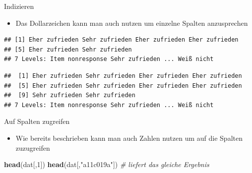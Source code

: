 \documentclass[ignorenonframetext,]{beamer}
\newenvironment{Shaded}{}{}
\newcommand{\KeywordTok}[1]{\textcolor[rgb]{0.00,0.44,0.13}{\textbf{{#1}}}}
\newcommand{\DecValTok}[1]{\textcolor[rgb]{0.25,0.63,0.44}{{#1}}}
\newcommand{\StringTok}[1]{\textcolor[rgb]{0.25,0.44,0.63}{{#1}}}
\newcommand{\CommentTok}[1]{\textcolor[rgb]{0.38,0.63,0.69}{\textit{{#1}}}}
\newcommand{\NormalTok}[1]{{#1}}
\providecommand{\tightlist}{%
\setlength{\itemsep}{0pt}\setlength{\parskip}{0pt}}
\begin{document}
\begin{frame}[fragile]{Indizieren}

\begin{itemize}
\tightlist
\item
  Das Dollarzeichen kann man auch nutzen um einzelne Spalten
  anzusprechen
\end{itemize}

\begin{Shaded}
\end{Shaded}

\begin{verbatim}
## [1] Eher zufrieden Sehr zufrieden Eher zufrieden Eher zufrieden
## [5] Eher zufrieden Sehr zufrieden
## 7 Levels: Item nonresponse Sehr zufrieden ... Weiß nicht
\end{verbatim}

\begin{Shaded}
\end{Shaded}

\begin{verbatim}
##  [1] Eher zufrieden Sehr zufrieden Eher zufrieden Eher zufrieden
##  [5] Eher zufrieden Sehr zufrieden Eher zufrieden Eher zufrieden
##  [9] Sehr zufrieden Sehr zufrieden
## 7 Levels: Item nonresponse Sehr zufrieden ... Weiß nicht
\end{verbatim}

\end{frame}

\begin{frame}[fragile]{Auf Spalten zugreifen}

\begin{itemize}
\tightlist
\item
  Wie bereits beschrieben kann man auch Zahlen nutzen um auf die Spalten
  zuzugreifen
\end{itemize}

\begin{Shaded}
\begin{Highlighting}[]
\KeywordTok{head}\NormalTok{(dat[,}\DecValTok{1}\NormalTok{])}
\KeywordTok{head}\NormalTok{(dat[,}\StringTok{"a11c019a"}\NormalTok{]) }\CommentTok{# liefert das gleiche Ergebnis}
\end{Highlighting}
\end{Shaded}

\end{frame}
\end{document}
